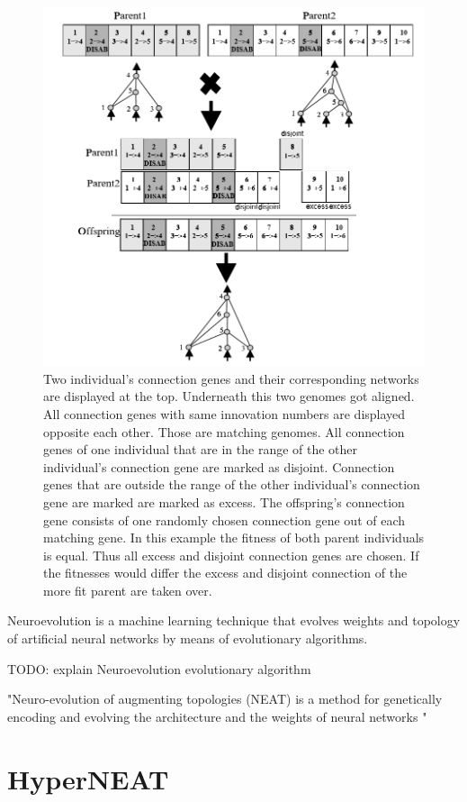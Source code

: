   
  
\begin{figure}[tb]
	\centering
	\includegraphics[width=0.7\linewidth]{figures/NEAT/NEATCrossOver}
	\caption[NEAT cross over]{Two individual's connection genes and their corresponding networks are displayed at the top. Underneath this two genomes got aligned. All connection genes with same innovation numbers are displayed opposite each other. Those are matching genomes. All connection genes of one individual that are in the range of the other individual's connection gene are marked as disjoint. Connection genes that are outside the range of the other individual's connection gene are marked are marked as excess. The offspring's connection gene consists of one randomly chosen connection gene out of each matching gene. In this example the fitness of both parent individuals is equal. Thus all excess and disjoint connection genes are chosen. If the fitnesses would differ the excess and disjoint connection of the more fit parent are taken over.\cite[p. 109]{NEAT}}
	\label{fig:neatcrossover}
\end{figure}
  
  
Neuroevolution is a machine learning technique that evolves weights and topology of artificial neural networks by means of evolutionary algorithms. 

TODO: explain 
Neuroevolution
evolutionary algorithm


"Neuro-evolution of augmenting topologies (NEAT) is a method for genetically encoding and evolving the architecture and the weights of neural networks "

\section{HyperNEAT}\label{HYPERNEAT}
